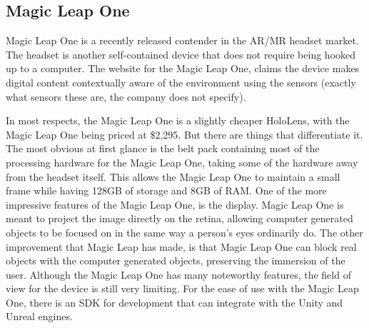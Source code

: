 \documentclass[10pt,draftclsnofoot,onecolumn,letterpaper]{IEEEtran}
\begin{document}
\subsection{Magic Leap One}
Magic Leap One is a recently released contender in the AR/MR headset market. The headset is another self-contained device that does not require being hooked up to a computer\cite{MLO}. The website for the Magic Leap One, claims the device makes digital content contextually aware of the environment using the sensors (exactly what sensors these are, the company does not specify)\cite{MLOpromo}.\par
In most respects, the Magic Leap One is a slightly cheaper HoloLens, with the Magic Leap One being priced at \$2,295\cite{MLOpromo}. But there are things that differentiate it. The most obvious at first glance is the belt pack containing most of the processing hardware for the Magic Leap One, taking some of the hardware away from the headset itself\cite{MLOpromo}. This allows the Magic Leap One to maintain a small frame while having 128GB of storage and 8GB of RAM\cite{MLOpromo}. One of the more impressive features of the Magic Leap One, is the display. Magic Leap One is meant to project the image directly on the retina, allowing computer generated objects to be focused on in the same way a person's eyes ordinarily do\cite{MLO}. The other improvement that Magic Leap has made, is that Magic Leap One can block real objects with the computer generated objects, preserving the immersion of the user\cite{MLO}. Although the Magic Leap One has many noteworthy features, the field of view for the device is still very limiting\cite{MLO}. For the ease of use with the Magic Leap One, there is an SDK for development that can integrate with the Unity and Unreal engines\cite{MLSDK}.\par
\end{document}
